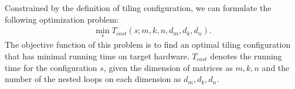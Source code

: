 Constrained by the definition of tiling configuration, we can formulate the following optimization problem:
\begin{equation}\nonumber
    \begin{array}{l}
       \mathop {\min }\limits_{s} T_{cost}(s ; m,k,n,d_m,d_k,d_n).
    \end{array}
\end{equation}
The objective function of this problem is to find an optimal tiling configuration that has minimal running time on target hardware. $T_{cost}$ denotes the running time for the configuration $s$, given the dimension of matrices as $m,k,n$ and the number of the nested loops on each dimension as $d_m, d_k, d_n$. 

